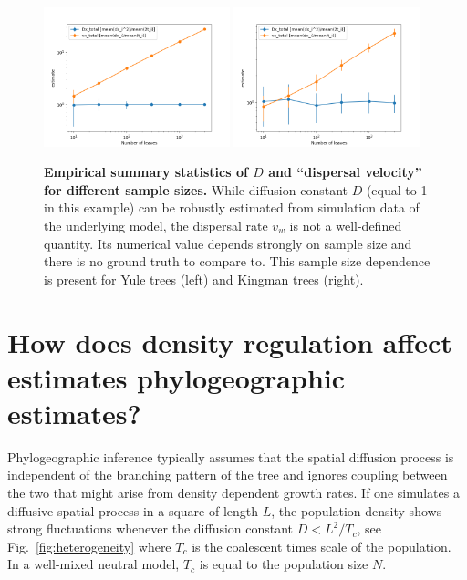 \documentclass[aps,rmp, onecolumn]{revtex4}
\begin{document}
\begin{figure}[tb]
    \includegraphics*[width=0.48\textwidth]{figures/yule_total_dispersal.png}
    \includegraphics*[width=0.48\textwidth]{figures/kingman_total_dispersal.png}
    \caption{\label{fig:D_and_v}{\bf Empirical summary statistics of $D$ and ``dispersal velocity'' for different sample sizes.}
    While diffusion constant $D$ (equal to 1 in this example) can be robustly estimated from simulation data of the underlying model, the dispersal rate $v_w$ is not a well-defined quantity. Its numerical value depends strongly on sample size and there is no ground truth to compare to. This sample size dependence is present for Yule trees (left) and Kingman trees (right). }
\end{figure}

\section*{How does density regulation affect estimates phylogeographic estimates?}
Phylogeographic inference typically assumes that the spatial diffusion process is independent of the branching pattern of the tree and ignores coupling between the two that might arise from density dependent growth rates.
If one simulates a diffusive spatial process in a square of length $L$, the population density shows strong fluctuations whenever the diffusion constant $D<L^2/T_c$, see Fig.~\ref{fig:heterogeneity} where $T_c$ is the coalescent times scale of the population.
In a well-mixed neutral model, $T_c$ is equal to the population size $N$.  
\end{document}

